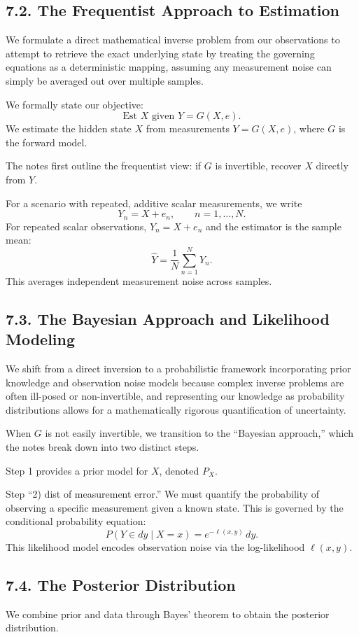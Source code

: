 \documentclass[11pt]{article}
\theoremstyle{definition}
\theoremstyle{remark}
\begin{document}
\subsection*{7.2. The Frequentist Approach to Estimation}
We formulate a direct mathematical inverse problem from our observations to attempt to retrieve the exact underlying state by treating the governing equations as a deterministic mapping, assuming any measurement noise can simply be averaged out over multiple samples.

We formally state our objective:
\[
\text{Est } X \text{ given } Y=G(X,e).
\]
We estimate the hidden state $X$ from measurements $Y=G(X,e)$, where $G$ is the forward model.

The notes first outline the frequentist view: if $G$ is invertible, recover $X$ directly from $Y$.

For a scenario with repeated, additive scalar measurements, we write
\[
Y_n=X+e_n,\qquad n=1,\dots,N.
\]
For repeated scalar observations, $Y_n=X+e_n$ and the estimator is the sample mean:
\[
\hat Y=\frac1N\sum_{n=1}^N Y_n.
\]
This averages independent measurement noise across samples.


\subsection*{7.3. The Bayesian Approach and Likelihood Modeling}
We shift from a direct inversion to a probabilistic framework incorporating prior knowledge and observation noise models because complex inverse problems are often ill-posed or non-invertible, and representing our knowledge as probability distributions allows for a mathematically rigorous quantification of uncertainty.

When $G$ is not easily invertible, we transition to the ``Bayesian approach,'' which the notes break down into two distinct steps.

Step 1 provides a prior model for $X$, denoted $P_X$.

Step ``2) dist of measurement error.'' We must quantify the probability of observing a specific measurement given a known state. This is governed by the conditional probability equation:
\[
P(Y\in dy\mid X=x)=e^{-\ell(x,y)}\,dy.
\]
This likelihood model encodes observation noise via the log-likelihood $\ell(x,y)$.


\subsection*{7.4. The Posterior Distribution}
We combine prior and data through Bayes' theorem to obtain the posterior distribution.
\end{document}
